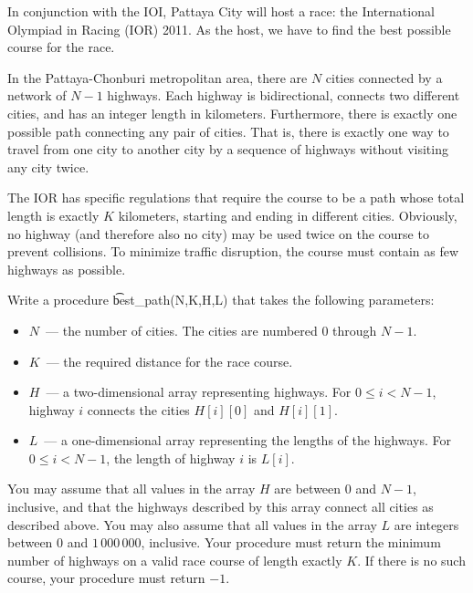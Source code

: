 In conjunction with the IOI, Pattaya City will host a race: the International Olympiad in Racing (IOR) 2011. As the host, we have to find the best possible course for the race. 

In the Pattaya-Chonburi metropolitan area, there are $N$ cities connected by a network of $N-1$ highways. Each highway is bidirectional, connects two different cities, and has an integer length in kilometers. Furthermore, there is exactly one possible path connecting any pair of cities. That is, there is exactly one way to travel from one city to another city by a sequence of highways without visiting any city twice.

The IOR has specific regulations that require the course to be a path whose total length is exactly $K$ kilometers, starting and ending in different cities. Obviously, no highway (and therefore also no city) may be used twice on the course to prevent collisions. To minimize traffic disruption, the course must contain as few highways as possible.

Write a procedure \t{best\_path(N,K,H,L)} that takes the following parameters:
\begin{itemize}
\item $N$~--- the number of cities. The cities are numbered $0$ through $N-1$.
\item $K$~--- the required distance for the race course.
\item $H$~--- a two-dimensional array representing highways. For $0 \le i < N-1$, highway $i$ connects the cities $H[i][0]$ and $H[i][1]$.
\item $L$~--- a one-dimensional array representing the lengths of the highways. For $0 \le i < N-1$, the length of highway $i$ is $L[i]$.
\end{itemize}

You may assume that all values in the array $H$ are between $0$ and $N-1$, inclusive, and that the highways described by this array connect all cities as described above. You may also assume that all values in the array $L$ are integers between $0$ and $1\,000\,000$, inclusive. Your procedure must return the minimum number of highways on a valid race course of length exactly $K$. If there is no such course, your procedure must return $-1$.